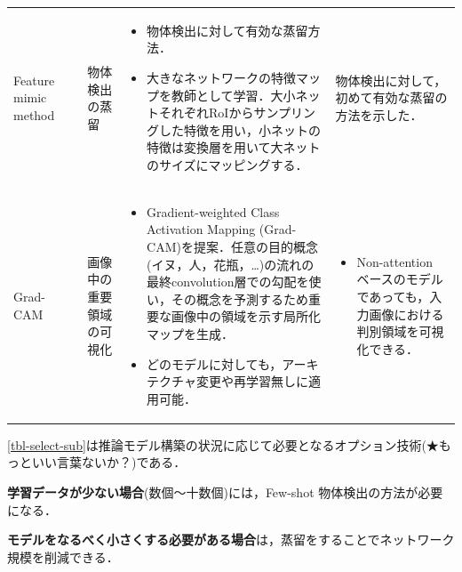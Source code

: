 \documentclass[originalpaper,fleqn]{jsaiart}     %
\begin{document}
\begin{table}
\begin{center}
\begin{tabularx}{\linewidth}{Xp{1.5cm}Xp{7cm}X}
            Feature mimic method & \cite{LJY17} & 物体検出の蒸留 & 
            \begin{itemize}
                \vspace{-0.7\baselineskip}
                \setlength{\leftskip}{-3mm}
                \item 物体検出に対して有効な蒸留方法．
                \item 大きなネットワークの特徴マップを教師として学習．大小ネットそれぞれRoIからサンプリングした特徴を用い，小ネットの特徴は変換層を用いて大ネットのサイズにマッピングする．
            \end{itemize}
            & 物体検出に対して，初めて有効な蒸留の方法を示した．\\

            Grad-CAM & \cite{SCDVPB17,SCDVPB20} & 画像中の重要領域の可視化 & 
            \begin{itemize}
                \vspace{-0.7\baselineskip}
                \setlength{\leftskip}{-3mm}
                \item Gradient-weighted Class Activation Mapping (Grad-CAM)を提案．任意の目的概念(イヌ，人，花瓶，…)の流れの最終convolution層での勾配を使い，その概念を予測するため重要な画像中の領域を示す局所化マップを生成．
                \item どのモデルに対しても，アーキテクチャ変更や再学習無しに適用可能．
            \end{itemize}
            &
            \begin{itemize}
                \vspace{-0.7\baselineskip}
                \setlength{\leftskip}{-3mm}
                \item Non-attention ベースのモデルであっても，入力画像における判別領域を可視化できる．
            \end{itemize}
            \\
            \bottomrule
        \end{tabularx}
    \end{center}
\end{table}%
\ref{tbl-select-sub}は推論モデル構築の状況に応じて必要となるオプション技術(★もっといい言葉ないか？)である．

{\bf 学習データが少ない場合}(数個〜十数個)には，Few-shot 物体検出の方法が必要になる\cite{WHGDY20}．

{\bf モデルをなるべく小さくする必要がある場合}は，蒸留をすることでネットワーク規模を削減できる\cite{LJY17}．
\end{document}
